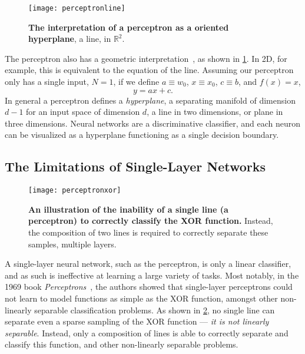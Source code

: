 \documentclass[thesis]{subfiles}
\begin{document}
\begin{figure}[tbp]
\centering
\texttt{[image: perceptronline]}
\caption[The interpretation of a perceptron as a hyperplane]{\textbf{The interpretation of a perceptron as a oriented hyperplane}, \ie a line, in $\mathbb{R}^2$.}
\label{fig:hyperplane}
\end{figure}
The perceptron also has a geometric interpretation~\citep{Bishop1995}, as shown in \cref{fig:hyperplane}. In 2D, for example, this is equivalent to the equation of the line. Assuming our perceptron only has a single input, \ie $N=1$, if we define $a\equiv w_0$, $x \equiv x_0$, $c \equiv b$, and $f(x) = x$,
%
\begin{equation}
y = a x + c.
\end{equation}
%
In general a perceptron defines a \emph{hyperplane}, a separating manifold of dimension $d - 1$ for an input space of dimension $d$, a line in two dimensions, or plane in three dimensions. Neural networks are a discriminative classifier, and each neuron can be visualized as a hyperplane functioning as a single decision boundary.

\subsection{The Limitations of Single-Layer Networks}\label{singlelayernetworks}
\begin{figure}[tbp]
\centering
\texttt{[image: perceptronxor]}
\caption[An illustration of the inability of a single line to correctly classify the XOR function]{\textbf{An illustration of the inability of a single line (\ie a perceptron) to correctly classify the XOR function.} Instead, the composition of two lines is required to correctly separate these samples, \ie multiple layers.}
\label{fig:perceptronxor}
\end{figure}
A single-layer neural network, such as the perceptron, is only a linear classifier, and as such is ineffective at learning a large variety of tasks. Most notably, in the 1969 book \emph{Perceptrons}~\citep{minsky1988perceptrons}, the authors showed that single-layer perceptrons could not learn to model functions as simple as the XOR function, amongst other non-linearly separable classification problems. As shown in \cref{fig:perceptronxor}, no single line can separate even a sparse sampling of the XOR function --- \ie\emph{it is not linearly separable}. Instead, only a composition of lines is able to correctly separate and classify this function, and other non-linearly separable problems.
\end{document}
